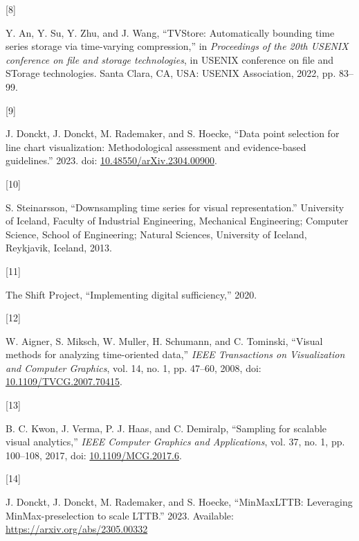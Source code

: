 \documentclass{article}
\newlength{\cslhangindent}
\newlength{\csllabelwidth}
\newlength{\cslentryspacingunit} %
\newenvironment{CSLReferences}[2] %
 {%
  \setlength{\parindent}{0pt}
  \ifodd #1
  \let\oldpar\par
  \def\par{\hangindent=\cslhangindent\oldpar}
  \fi
  \setlength{\parskip}{#2\cslentryspacingunit}
 }%
 {}
\newcommand{\CSLLeftMargin}[1]{\parbox[t]{\csllabelwidth}{#1}}
\newcommand{\CSLRightInline}[1]{\parbox[t]{\linewidth - \csllabelwidth}{#1}\break}
\begin{document}
\begin{CSLReferences}{0}{0}
\leavevmode{}%
\CSLLeftMargin{{[}8{]} }%
\CSLRightInline{Y. An, Y. Su, Y. Zhu, and J. Wang, {``TVStore:
Automatically bounding time series storage via time-varying
compression,''} in \emph{Proceedings of the 20th USENIX conference on
file and storage technologies}, in USENIX conference on file and STorage
technologies. Santa Clara, CA, USA: USENIX Association, 2022, pp.
83--99.}

\leavevmode{}%
\CSLLeftMargin{{[}9{]} }%
\CSLRightInline{J. Donckt, J. Donckt, M. Rademaker, and S. Hoecke,
{``Data point selection for line chart visualization: Methodological
assessment and evidence-based guidelines.''} 2023. doi:
\href{https://doi.org/10.48550/arXiv.2304.00900}{10.48550/arXiv.2304.00900}.}

\leavevmode{}%
\CSLLeftMargin{{[}10{]} }%
\CSLRightInline{S. Steinarsson, {``Downsampling time series for visual
representation.''} University of Iceland, Faculty of Industrial
Engineering, Mechanical Engineering; Computer Science, School of
Engineering; Natural Sciences, University of Iceland, Reykjavik,
Iceland, 2013.}

\leavevmode{}%
\CSLLeftMargin{{[}11{]} }%
\CSLRightInline{The Shift Project, {``Implementing digital
sufficiency,''} 2020.}

\leavevmode{}%
\CSLLeftMargin{{[}12{]} }%
\CSLRightInline{W. Aigner, S. Miksch, W. Muller, H. Schumann, and C.
Tominski, {``Visual methods for analyzing time-oriented data,''}
\emph{IEEE Transactions on Visualization and Computer Graphics}, vol.
14, no. 1, pp. 47--60, 2008, doi:
\href{https://doi.org/10.1109/TVCG.2007.70415}{10.1109/TVCG.2007.70415}.}

\leavevmode{}%
\CSLLeftMargin{{[}13{]} }%
\CSLRightInline{B. C. Kwon, J. Verma, P. J. Haas, and C. Demiralp,
{``Sampling for scalable visual analytics,''} \emph{IEEE Computer
Graphics and Applications}, vol. 37, no. 1, pp. 100--108, 2017, doi:
\href{https://doi.org/10.1109/MCG.2017.6}{10.1109/MCG.2017.6}.}

\leavevmode{}%
\CSLLeftMargin{{[}14{]} }%
\CSLRightInline{J. Donckt, J. Donckt, M. Rademaker, and S. Hoecke,
{``MinMaxLTTB: Leveraging MinMax-preselection to scale LTTB.''} 2023.
Available: \url{https://arxiv.org/abs/2305.00332}}


\end{CSLReferences}
\end{document}
